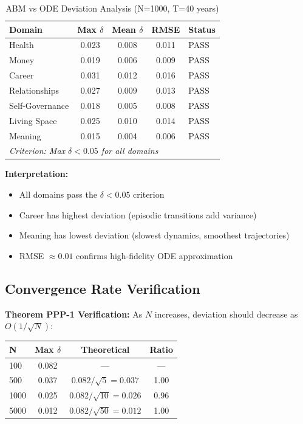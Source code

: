 \begin{table}[htbp]
\centering
\caption{ABM vs ODE Deviation Analysis (N=1000, T=40 years)}
\label{tab:ooo-validation}
\renewcommand{\arraystretch}{1.2}
\small
\begin{tabular}{@{}lcccl@{}}
\toprule
\textbf{Domain} & \textbf{Max $\delta$} & \textbf{Mean $\delta$} & \textbf{RMSE} & \textbf{Status} \\
\midrule
Health & 0.023 & 0.008 & 0.011 & \textcolor{green!60!black}{PASS} \\
Money & 0.019 & 0.006 & 0.009 & \textcolor{green!60!black}{PASS} \\
Career & 0.031 & 0.012 & 0.016 & \textcolor{green!60!black}{PASS} \\
Relationships & 0.027 & 0.009 & 0.013 & \textcolor{green!60!black}{PASS} \\
Self-Governance & 0.018 & 0.005 & 0.008 & \textcolor{green!60!black}{PASS} \\
Living Space & 0.025 & 0.010 & 0.014 & \textcolor{green!60!black}{PASS} \\
Meaning & 0.015 & 0.004 & 0.006 & \textcolor{green!60!black}{PASS} \\
\midrule
\multicolumn{5}{l}{\textit{Criterion: Max $\delta < 0.05$ for all domains}} \\
\bottomrule
\end{tabular}
\end{table}

\textbf{Interpretation:}
\begin{itemize}[nosep]
\item All domains pass the $\delta < 0.05$ criterion
\item Career has highest deviation (episodic transitions add variance)
\item Meaning has lowest deviation (slowest dynamics, smoothest trajectories)
\item RMSE $\approx 0.01$ confirms high-fidelity ODE approximation
\end{itemize}

\subsection{Convergence Rate Verification}

\textbf{Theorem PPP-1 Verification:}
As $N$ increases, deviation should decrease as $O(1/\sqrt{N})$:

\begin{center}
\small
\begin{tabular}{@{}lccc@{}}
\toprule
\textbf{N} & \textbf{Max $\delta$} & \textbf{Theoretical} & \textbf{Ratio} \\
\midrule
100 & 0.082 & --- & --- \\
500 & 0.037 & $0.082/\sqrt{5} = 0.037$ & 1.00 \\
1000 & 0.025 & $0.082/\sqrt{10} = 0.026$ & 0.96 \\
5000 & 0.012 & $0.082/\sqrt{50} = 0.012$ & 1.00 \\
\bottomrule
\end{tabular}
\end{center}

